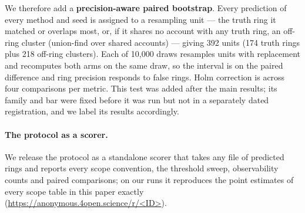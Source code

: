 We therefore add a \textbf{precision-aware paired bootstrap}. Every prediction of every method
and seed is assigned to a resampling unit --- the truth ring it matched or overlaps most, or,
if it shares no account with any truth ring, an off-ring cluster (union-find over shared
accounts) --- giving 392 units (174 truth rings plus 218 off-ring clusters). Each of 10{,}000
draws resamples units with replacement and recomputes both arms on the same draw, so the
interval is on the paired difference and ring precision responds to false rings. Holm
correction is across four comparisons per metric.
This test was added after the main results; its family and bar were fixed before it was run
but not in a separately dated registration, and we label its results accordingly.

\paragraph{The protocol as a scorer.}
We release the protocol as a standalone scorer that takes any file of predicted rings and
reports every scope convention, the threshold sweep, observability counts and paired
comparisons; on our runs it reproduces the point estimates of every scope table in this paper
exactly (\url{https://anonymous.4open.science/r/<ID>}).
